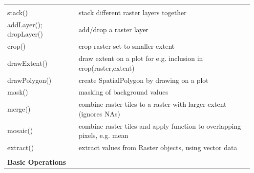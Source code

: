 \documentclass[10pt,landscape]{article}
\begin{document}
\begin{multicols}{3}
\begin{tabular}{@{}p{\the\MyLen}%
                @{}p{\linewidth-\the\MyLen}@{}}
 &  \\                
stack() & stack different raster layers together \\
addLayer(); dropLayer()	& add/drop a raster layer\\
crop() 		& crop raster set to smaller extent  \\
drawExtent()	& draw extent on a plot for e.g. inclusion in crop(raster,extent)\\
drawPolygon()	& create SpatialPolygon by drawing on a plot\\
mask() 		& masking of background values \\
merge() & combine raster tiles to a raster with larger extent (ignores NAs)
\\
mosaic() & combine raster tiles  and apply function to overlapping pixels, e.g.
mean\\
extract() 	& extract values from Raster objects, using vector data  \\
& \\
\textbf{Basic Operations} & \\


\end{tabular}
\end{multicols}
\end{document}
